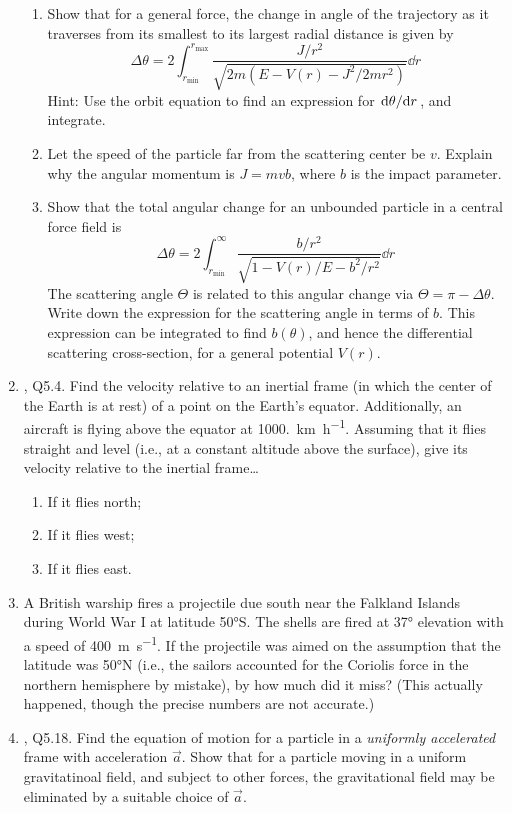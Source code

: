 \documentclass[../psets.tex]{subfiles}
\begin{document}
\begin{enumerate}
\begin{enumerate}
        \item Show that for a general force, the change in angle of the trajectory as it traverses from its smallest to its largest radial distance is given by
        \begin{equation*}
            \Delta\theta = 2\int_{r_\text{min}}^{r_\text{max}}\frac{J/r^2}{\sqrt{2m(E-V(r)-J^2/2mr^2)}}\dd{r}
        \end{equation*}
        Hint: Use the orbit equation to find an expression for $\dv*{\theta}{r}$, and integrate.
        \item Let the speed of the particle far from the scattering center be $v$. Explain why the angular momentum is $J=mvb$, where $b$ is the impact parameter.
        \item Show that the total angular change for an unbounded particle in a central force field is
        \begin{equation*}
            \Delta\theta = 2\int_{r_\text{min}}^\infty\frac{b/r^2}{\sqrt{1-V(r)/E-b^2/r^2}}\dd{r}
        \end{equation*}
        The scattering angle $\Theta$ is related to this angular change via $\Theta=\pi-\Delta\theta$. Write down the expression for the scattering angle in terms of $b$. This expression can be integrated to find $b(\theta)$, and hence the differential scattering cross-section, for a general potential $V(r)$.
    \end{enumerate}
    \item \textcite{bib:KibbleBerkshire}, Q5.4. Find the velocity relative to an inertial frame (in which the center of the Earth is at rest) of a point on the Earth's equator. Additionally, an aircraft is flying above the equator at \SI[per-mode=symbol]{1000.}{\kilo\meter\per\hour}. Assuming that it flies straight and level (i.e., at a constant altitude above the surface), give its velocity relative to the inertial frame\dots
    \begin{enumerate}
        \item If it flies north;
        \item If it flies west;
        \item If it flies east.
    \end{enumerate}
    \item A British warship fires a projectile due south near the Falkland Islands during World War I at latitude \ang{50}S. The shells are fired at \ang{37} elevation with a speed of \SI[per-mode=symbol]{400}{\meter\per\second}. If the projectile was aimed on the assumption that the latitude was \ang{50}N (i.e., the sailors accounted for the Coriolis force in the northern hemisphere by mistake), by how much did it miss? (This actually happened, though the precise numbers are not accurate.)
    \item \textcite{bib:KibbleBerkshire}, Q5.18. Find the equation of motion for a particle in a \emph{uniformly accelerated} frame with acceleration $\vec{a}$. Show that for a particle moving in a uniform gravitatinoal field, and subject to other forces, the gravitational field may be eliminated by a suitable choice of $\vec{a}$.
\end{enumerate}
\end{document}

